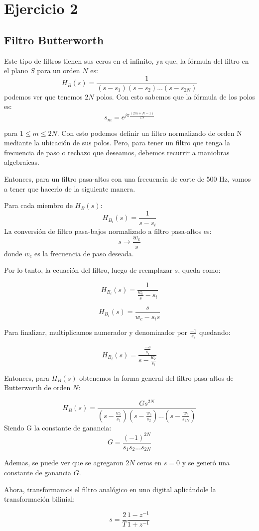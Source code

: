 \documentclass[10pt,a4paper,final]{article}
\begin{document}
\section{Ejercicio 2}

\subsection{Filtro Butterworth}
Este tipo de filtros tienen sus ceros en el infinito, ya que, la fórmula del filtro en el plano $S$ para un orden $N$ es:
\[
H_B(s)=\frac{1}{(s-s_1)(s-s_2)...(s-s_{2N})}
\]
podemos ver que tenemos $2N$ polos. Con esto sabemos que la fórmula de los polos es:
\[
s_m=e^{j\pi\frac{(2m+N-1)}{2N}}
\]

para $1\leq m\leq 2N$. Con esto podemos definir un filtro normalizado de orden N mediante la ubicación de sus polos. Pero, para tener un filtro que tenga la frecuencia de paso o rechazo que deseamos, debemos recurrir a maniobras algebraicas.

Entonces, para un filtro pasa-altos con una frecuencia de corte de 500 Hz, vamos a tener que hacerlo de la siguiente manera.

Para cada miembro de $H_B(s)$:
\[ H_{B_i}(s)=\frac{1}{s-s_i} \]
La conversión de filtro pasa-bajos normalizado a  filtro pasa-altos es:
\[ s \rightarrow \frac{w_c}{s} \]
donde $w_c$ es la frecuencia de paso deseada.

Por lo tanto, la ecuación del filtro, luego de reemplazar $s$, queda como:

\[ H_{B_i}(s)=\frac{1}{\frac{w_c}{s}-s_i} \]

\[ H_{B_i}(s)=\frac{s}{w_c-s_is} \]

Para finalizar, multiplicamos numerador y denominador por $\frac{-1}{s_i}$ quedando:

\[ H_{B_i}(s)=\frac{\frac{-s}{s_i}}{s-\frac{w_c}{s_i}} \]

Entonces, para $H_B(s)$  obtenemos la forma general del filtro pasa-altos de Butterworth de orden $N$:

\[ 
H_B(s)=\frac{Gs^{2N}}{(s-\frac{w_c}{s_1})(s-\frac{w_c}{s_2})...(s-\frac{w_c}{s_{2N}})} 
\]
Siendo G la constante de ganancia:
\[
G=\frac{(-1)^{2N}}{s_1s_2...s_{2N}}
\]

Ademas, se puede ver que se agregaron $2N$ ceros en $s=0$ y se generó una constante de ganancia $G$.

Ahora, transformamos el filtro analógico en uno digital aplicándole la transformación bilinial:

\[ s=\frac{2}{T} \frac{1-z^{-1}}{1+z^{-1}} \]
\end{document}
